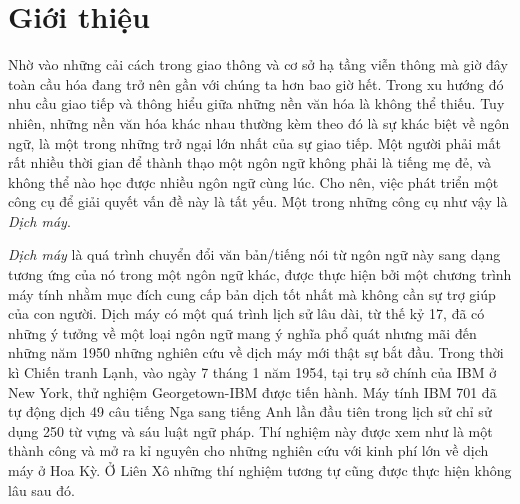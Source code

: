 
\chapter{Giới thiệu }
\ifpdf
    \graphicspath{{Chapter1/Chapter1Figs/PNG/}{Chapter1/Chapter1Figs/PDF/}{Chapter1/Chapter1Figs/}}
\else
    \graphicspath{{Chapter1/Chapter1Figs/EPS/}{Chapter1/Chapter1Figs/}}
\fi


Nhờ vào những cải cách trong giao thông và cơ sở hạ tầng viễn thông mà giờ đây toàn cầu hóa đang trở nên gần với chúng ta hơn bao giờ hết. Trong xu hướng đó nhu cầu giao tiếp và thông hiểu giữa những nền văn hóa là không thể thiếu. Tuy nhiên, những nền văn hóa khác nhau thường kèm theo đó là sự khác biệt về ngôn ngữ, là một trong những trở ngại lớn nhất của sự giao tiếp. Một người phải mất rất nhiều thời gian để thành thạo một ngôn ngữ không phải là tiếng mẹ đẻ, và không thể nào học được nhiều ngôn ngữ cùng lúc. Cho nên, việc phát triển một công cụ để giải quyết vấn đề này là tất yếu. Một trong những công cụ như vậy là \textit{Dịch máy}.

\textit{Dịch máy} là quá trình chuyển đổi văn bản/tiếng nói từ ngôn ngữ này sang dạng tương ứng của nó trong một ngôn ngữ khác, được thực hiện bởi một chương trình máy tính nhằm mục đích cung cấp bản dịch tốt nhất mà không cần sự trợ giúp của con người. Dịch máy có một quá trình lịch sử lâu dài, từ thế kỷ 17, đã có những ý tưởng về một loại ngôn ngữ mang ý nghĩa phổ quát nhưng mãi đến những năm 1950 những nghiên cứu về dịch máy mới thật sự bắt đầu. Trong thời kì Chiến tranh Lạnh, vào ngày 7 tháng 1 năm 1954, tại trụ sở chính của IBM ở New York, thử nghiệm Georgetown-IBM được tiến hành. Máy tính IBM 701 đã tự động dịch 49 câu tiếng Nga sang tiếng Anh lần đầu tiên trong lịch sử chỉ sử dụng 250 từ vựng và sáu luật ngữ pháp. Thí nghiệm này được xem như là một thành công và mở ra kỉ nguyên cho những nghiên cứu với kinh phí lớn về dịch máy ở Hoa Kỳ. Ở Liên Xô những thí nghiệm tương tự cũng được thực hiện không lâu sau đó.

